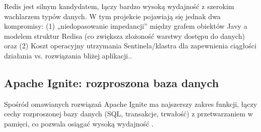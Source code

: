 \noindent
Redis jest silnym kandydatem, łączy bardzo wysoką wydajność z szerokim wachlarzem typów danych.
W tym projekcie pojawiają się jednak dwa kompromisy: (1) „niedopasowanie impedancji” między
grafem obiektów Javy a modelem struktur Redisa (co zwiększa złożoność warstwy dostępu do danych)
oraz (2) Koszt operacyjny utrzymania Sentinela/klastra dla zapewnienia ciągłości działania vs. rozwiązania bliżej aplikacji.\cite{redis-docs,spring-docs}.

\subsection{Apache Ignite: rozproszona baza danych}

Spośród omawianych rozwiązań Apache Ignite ma najszerszy zakres funkcji, łączy cechy rozproszonej bazy danych (SQL, transakcje, trwałość) z przetwarzaniem w pamięci, co pozwala osiągać wysoką wydajność \cite{ignite-docs}.

